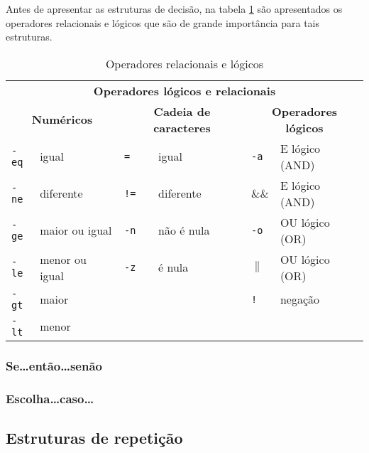 \documentclass[11pt]{../classes/ifscarticle}
\begin{document}
Antes de apresentar as estruturas de decisão, na tabela \ref{tabelaoperadores} são apresentados os operadores relacionais e lógicos que são de grande importância para tais estruturas.

\begin{table}[!htpb]
 \begin{center}
\begin{tabular}{ll||ll||ll} \toprule
\multicolumn{6}{c}{\textbf{Operadores lógicos e relacionais}} \\ 
\multicolumn{2}{c}{\textbf{Numéricos}} & \multicolumn{2}{c}{\textbf{Cadeia de caracteres}} & \multicolumn{2}{c}{\textbf{Operadores lógicos}}\\ \midrule
\texttt{-eq} & igual     & \texttt{=} & igual & \texttt{-a} & E lógico (AND) \\ \hline
\texttt{-ne} & diferente & \texttt{!=} & diferente & \&\& & E lógico (AND)\\ \hline
\texttt{-ge} & maior ou igual & \texttt{-n} & não é nula & \texttt{-o} & OU lógico (OR)\\ \hline
\texttt{-le} & menor ou igual & \texttt{-z} & é nula & $\|$ & OU lógico (OR)\\ \hline
\texttt{-gt} & maior &  & & \texttt{!} & negação \\ \hline
\texttt{-lt} & menor &  &  & &\\ \bottomrule
 \end{tabular}
 \end{center}
\caption{Operadores relacionais e lógicos}
\label{tabelaoperadores}
\end{table}


\subsubsection{Se\ldots então\ldots senão}



\subsubsection{Escolha\ldots caso\ldots}



\subsection{Estruturas de repetição}
\end{document}
